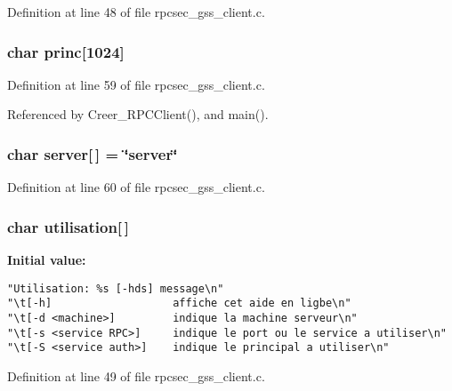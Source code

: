 Definition at line 48 of file rpcsec\_\-gss\_\-client.c.
\subsubsection{\setlength{\rightskip}{0pt plus 5cm}char {\bf princ}[1024]}\label{rpcsec__gss__client_8c_a13}




Definition at line 59 of file rpcsec\_\-gss\_\-client.c.

Referenced by Creer\_\-RPCClient(), and main().
\subsubsection{\setlength{\rightskip}{0pt plus 5cm}char {\bf server}[$\,$] = \char`\"{}server\char`\"{}}\label{rpcsec__gss__client_8c_a14}




Definition at line 60 of file rpcsec\_\-gss\_\-client.c.
\subsubsection{\setlength{\rightskip}{0pt plus 5cm}char {\bf utilisation}[$\,$]}\label{rpcsec__gss__client_8c_a12}


{\bf Initial value:}

\footnotesize\begin{verbatim}
"Utilisation: %s [-hds] message\n"
"\t[-h]                   affiche cet aide en ligbe\n"
"\t[-d <machine>]         indique la machine serveur\n"
"\t[-s <service RPC>]     indique le port ou le service a utiliser\n" 
"\t[-S <service auth>]    indique le principal a utiliser\n"
\end{verbatim}\normalsize 


Definition at line 49 of file rpcsec\_\-gss\_\-client.c.